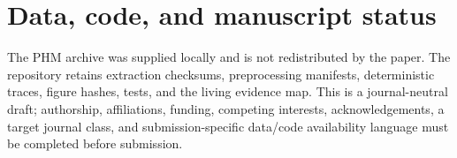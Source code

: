 \documentclass[10pt,twocolumn]{article}
\begin{document}
\section*{Data, code, and manuscript status}

The PHM archive was supplied locally and is not redistributed by the paper.
The repository retains extraction checksums, preprocessing manifests,
deterministic traces, figure hashes, tests, and the living evidence map. This
is a journal-neutral draft; authorship, affiliations, funding, competing
interests, acknowledgements, a target journal class, and submission-specific
data/code availability language must be completed before submission.



\end{document}
